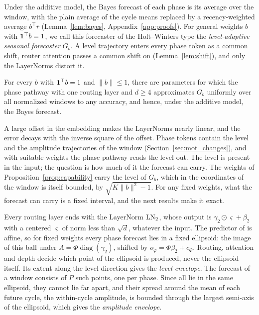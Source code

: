 {
Under the additive model, the Bayes forecast of each phase is its average over the window, with the plain average of the cycle means replaced by a recency-weighted average $b^\top\bar r$ (Lemma~\ref{lem:bayes}, Appendix~\ref{app:proofs}). For general weights $b$ with $\mathbf 1^\top b=1$, we call this forecaster of the Holt--Winters type the \emph{level-adaptive seasonal forecaster} $G_b$. A level trajectory enters every phase token as a common shift, router attention passes a common shift on (Lemma~\ref{lem:shift}), and only the LayerNorms distort it.

\begin{proposition}
\label{prop:capability}
For every $b$ with $\mathbf 1^\top b=1$ and $\|b\|\le1$, there are parameters for which the phase pathway with one routing layer and $d\ge4$ approximates $G_b$ uniformly over all normalized windows to any accuracy, and hence, under the additive model, the Bayes forecast.
\end{proposition}

A large offset in the embedding makes the LayerNorms nearly linear, and the error decays with the inverse square of the offset. Phase tokens contain the level and the amplitude trajectories of the window (Section~\ref{sec:mot_changes}), and with suitable weights the phase pathway reads the level out. The level is present in the input; the question is how much of it the forecast can carry. The weights of Proposition~\ref{prop:capability} carry the level of $G_b$, which in the coordinates of the window is itself bounded, by $\sqrt{K\|b\|^2-1}$. For any fixed weights, what the forecast can carry is a fixed interval, and the next results make it exact.

Every routing layer ends with the LayerNorm $\operatorname{LN}_2$, whose output is $\gamma_2\odot\varsigma+\beta_2$ with a centered $\varsigma$ of norm less than $\sqrt d$, whatever the input. The predictor of  is affine, so for fixed weights every phase forecast lies in a fixed ellipsoid: the image of this ball under $A=\Phi\operatorname{diag}(\gamma_2)$, shifted by $o_\varphi=\Phi\beta_2+c_\Phi$. Routing, attention and depth decide which point of the ellipsoid is produced, never the ellipsoid itself. Its extent along the level direction gives the \emph{level envelope}. The forecast of a window consists of $P$ such points, one per phase. Since all lie in the same ellipsoid, they cannot lie far apart, and their spread around the mean of each future cycle, the within-cycle amplitude, is bounded through the largest semi-axis of the ellipsoid, which gives the \emph{amplitude envelope}.

}
